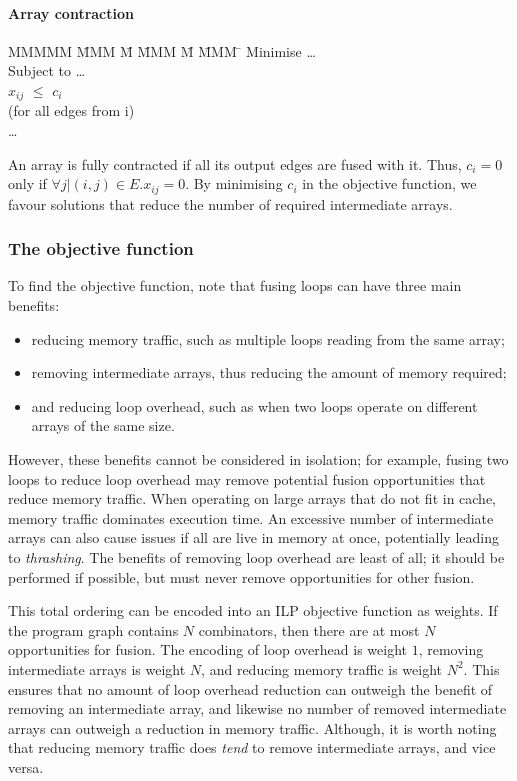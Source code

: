 \paragraph{Array contraction}
\begin{tabbing}
MMMMM   \= MMM \= M \= MMM \= M \= MMM \= \kill
Minimise   \> \ldots \\
Subject to \> \ldots \\
           \> $x_{ij}$    \> $\le$ \> $c_i$           \>       \>            \\
           \> (for all edges from i)            \\
           \> \ldots \\
\end{tabbing}
An array is fully contracted if all its output edges are fused with it.
Thus, $c_i=0$ only if $\forall j | (i,j) \in E. x_{ij} = 0$.
By minimising $c_i$ in the objective function, we favour solutions that reduce the number of required intermediate arrays.


\subsubsection{The objective function}

To find the objective function, note that fusing loops can have three main benefits:
\begin{itemize}
\item
reducing memory traffic, such as multiple loops reading from the same array;
\item
removing intermediate arrays, thus reducing the amount of memory required;
\item
and reducing loop overhead, such as when two loops operate on different arrays of the same size.
\end{itemize}
However, these benefits cannot be considered in isolation; for example, fusing two loops to reduce loop overhead may remove potential fusion opportunities that reduce memory traffic.
When operating on large arrays that do not fit in cache, memory traffic dominates execution time.
An excessive number of intermediate arrays can also cause issues if all are live in memory at once, potentially leading to \emph{thrashing}.
The benefits of removing loop overhead are least of all; it should be performed if possible, but must never remove opportunities for other fusion.

This total ordering can be encoded into an ILP objective function as weights.
If the program graph contains $N$ combinators, then there are at most $N$ opportunities for fusion.
The encoding of loop overhead is weight $1$, removing intermediate arrays is weight $N$, and reducing memory traffic is weight $N^2$.
This ensures that no amount of loop overhead reduction can outweigh the benefit of removing an intermediate array,
and likewise no number of removed intermediate arrays can outweigh a reduction in memory traffic.
Although, it is worth noting that reducing memory traffic does \emph{tend} to remove intermediate arrays, and vice versa.

